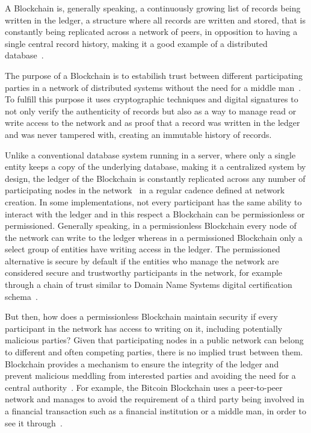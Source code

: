 A Blockchain is, generally speaking, a continuously growing list of records
being written in the ledger, a structure where all records are written and
stored, that is constantly being replicated across a network of peers, in
opposition to having a single central record history, making it a good example
of a distributed database~\cite{Barclay2017}.

The purpose of a Blockchain is to estabilish trust between different
participating parties in a network of distributed systems without the need for
a middle man~\cite{Drescher2017}. To fulfill this purpose it uses cryptographic
techniques and digital signatures to not only verify the authenticity of
records but also as a way to manage read or write access to the network and as
proof that a record was written in the ledger and was never tampered with,
creating an immutable history of records.

Unlike a conventional database system running in a server, where only a single
entity keeps a copy of the underlying database, making it a centralized system
by design, the ledger of the Blockchain is constantly replicated across any
number of participating nodes in the network~\cite{Lewis2015} in a regular
cadence defined at network creation. In some implementations, not every
participant has the same ability to interact with the ledger and in this
respect a Blockchain can be permissionless or permissioned.  Generally
speaking, in a permissionless Blockchain every node of the network can write to
the ledger whereas in a permissioned Blockchain only a select group of entities
have writing access in the ledger. The permissioned alternative is secure by
default if the entities who manage the network are considered secure and
trustworthy participants in the network, for example through a chain of trust
similar to Domain Name Systems digital certification
schema~\cite{Lewis2015,Valenta2017}.

But then, how does a permissionless Blockchain maintain security if every
participant in the network has access to writing on it, including potentially
malicious parties? Given that participating nodes in a public network can
belong to different and often competing parties, there is no implied trust
between them. Blockchain provides a mechanism to ensure the integrity of the
ledger and prevent malicious meddling from interested parties and avoiding the
need for a central authority~\cite{Barclay2017}. For example, the Bitcoin
Blockchain uses a peer-to-peer network and manages to avoid the requirement of
a third party being involved in a financial transaction such as a financial
institution or a middle man, in order to see it through~\cite{Nakamoto2008}.

